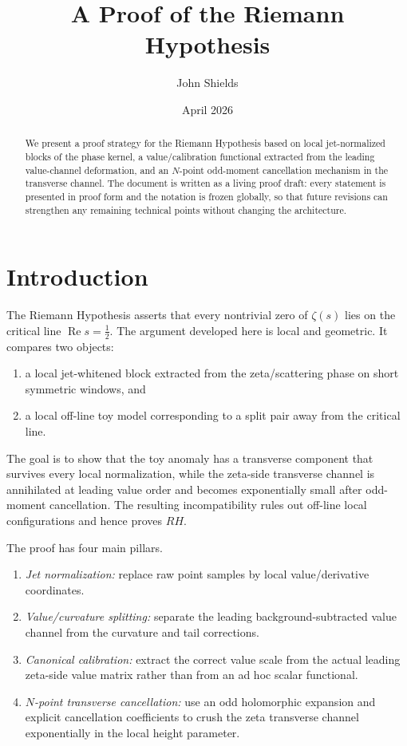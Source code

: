 \documentclass[11pt,a4paper]{amsart}
\title{A Proof of the Riemann Hypothesis}
\author{John Shields}
\date{April 2026}
\def\RH{RH}%
\theoremstyle{plain}
\theoremstyle{definition}
\newcommand{\RH}{\mathrm{RH}}
\newcommand{\RePart}{\operatorname{Re}}
\begin{document}
\begin{abstract}
We present a proof strategy for the Riemann Hypothesis based on local jet-normalized blocks of the phase kernel, a value/calibration functional extracted from the leading value-channel deformation, and an $N$-point odd-moment cancellation mechanism in the transverse channel. The document is written as a living proof draft: every statement is presented in proof form and the notation is frozen globally, so that future revisions can strengthen any remaining technical points without changing the architecture.
\end{abstract}

\maketitle

\tableofcontents

\newpage

\section{Introduction}

The Riemann Hypothesis asserts that every nontrivial zero of $\zeta(s)$ lies on the critical line $\RePart s = \tfrac12$. The argument developed here is local and geometric. It compares two objects:
\begin{enumerate}[label=(\roman*),nosep]
    \item a local jet-whitened block extracted from the zeta/scattering phase on short symmetric windows, and
    \item a local off-line toy model corresponding to a split pair away from the critical line.
\end{enumerate}
The goal is to show that the toy anomaly has a transverse component that survives every local normalization, while the zeta-side transverse channel is annihilated at leading value order and becomes exponentially small after odd-moment cancellation. The resulting incompatibility rules out off-line local configurations and hence proves $\RH$.

The proof has four main pillars.
\begin{enumerate}[label=\arabic*.,nosep]
    \item \emph{Jet normalization:} replace raw point samples by local value/derivative coordinates.
    \item \emph{Value/curvature splitting:} separate the leading background-subtracted value channel from the curvature and tail corrections.
    \item \emph{Canonical calibration:} extract the correct value scale from the actual leading zeta-side value matrix rather than from an ad hoc scalar functional.
    \item \emph{$N$-point transverse cancellation:} use an odd holomorphic expansion and explicit cancellation coefficients to crush the zeta transverse channel exponentially in the local height parameter.
\end{enumerate}
\end{document}
